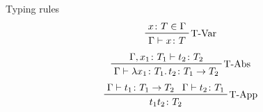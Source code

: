 \documentclass[aspectration=169]{beamer}
\begin{document}
\begin{frame}
  Typing rules
  \begin{displaymath}  
    \prftree[r]{T-Var}
    {x \colon T \in \Gamma}
    {\Gamma \vdash x \colon T}
  \end{displaymath}  
  \begin{displaymath}  
    \prftree[r]{T-Abs}
    {\Gamma, x_1 \colon T_1 \vdash t_2 \colon T_2}
    {\Gamma \vdash \lambda x_1 \colon T_1 \ldotp t_2 \colon T_1 \rightarrow T_2}
  \end{displaymath}  
  \begin{displaymath}  
    \prftree[r]{T-App}
    {\Gamma \vdash t_1 \colon T_1 \rightarrow T_2}
    {\Gamma \vdash t_2 \colon T_1}
    {t_1 t_2 \colon T_2}
  \end{displaymath}  
\end{frame}
\end{document}
